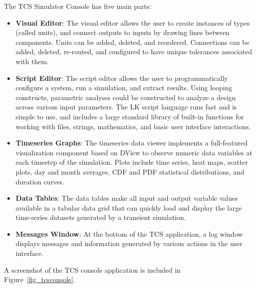 \documentclass{article}
\begin{document}
The TCS Simulator Console has five main parts:
\begin{itemize}
\item \textbf{Visual Editor}: The visual editor allows the user to create instances of types (called units), and connect outputs to inputs by drawing lines between components.  Units can be added, deleted, and reordered.  Connections can be added, deleted, re-routed, and configured to have unique tolerances associated with them.
\item \textbf{Script Editor}: The script editor allows the user to programmatically configure a system, run a simulation, and extract results.  Using looping constructs, parametric analyses could be constructed to analyze a design across various input parameters.  The LK script language runs fast and is simple to use, and includes a large standard library of built-in functions for working with files, strings, mathematics, and basic user interface interactions.
\item \textbf{Timeseries Graphs}: The timeseries data viewer implements a full-featured visualization component based on DView to observe numeric data variables at each timestep of the simulation.  Plots include time series, heat maps, scatter plots, day and month averages, CDF and PDF statistical distributions, and duration curves.
\item \textbf{Data Tables}: The data tables make all input and output variable values available in a tabular data grid that can quickly load and display the large time-series datasets generated by a transient simulation.
\item \textbf{Messages Window}: At the bottom of the TCS application, a log window displays messages and information generated by various actions in the user interface.
\end{itemize}

A screenshot of the TCS console application is included in Figure~\ref{fig_tcsconsole}.
\end{document}
